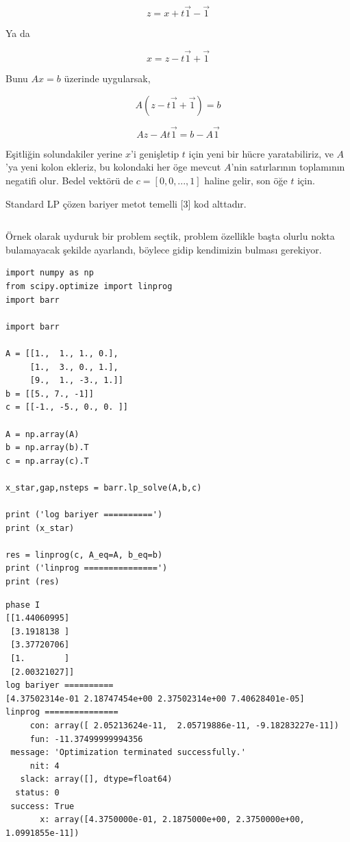 \documentclass[12pt,fleqn]{article}\usepackage{../../common}
\begin{document}
$$
z = x + t \vec{1} - \vec{1}
$$

Ya da

$$
x = z - t\vec{1} + \vec{1}
$$

Bunu $Ax = b$ üzerinde uygularsak, 

$$
A (z - t\vec{1} + \vec{1}) = b
$$

$$
Az - A t\vec{1} = b - A\vec{1}
$$

Eşitliğin solundakiler yerine $x$'i genişletip $t$ için yeni bir hücre
yaratabiliriz, ve $A$'ya yeni kolon ekleriz, bu kolondaki her öge mevcut
$A$'nin satırlarının toplamının negatifi olur. Bedel vektörü de
$c = [0, 0, ..., 1]$ haline gelir, son öğe $t$ için.

Standard LP çözen bariyer metot temelli [3] kod alttadır. 

\inputminted[fontsize=\footnotesize]{python}{barr.py}

Örnek olarak uyduruk bir problem seçtik, problem özellikle başta olurlu
nokta bulamayacak şekilde ayarlandı, böylece gidip kendimizin bulması
gerekiyor.

\begin{verbatim}
import numpy as np
from scipy.optimize import linprog
import barr

import barr

A = [[1.,  1., 1., 0.],
     [1.,  3., 0., 1.],
     [9.,  1., -3., 1.]]
b = [[5., 7., -1]]
c = [[-1., -5., 0., 0. ]]

A = np.array(A)
b = np.array(b).T
c = np.array(c).T

x_star,gap,nsteps = barr.lp_solve(A,b,c)

print ('log bariyer ==========')
print (x_star)

res = linprog(c, A_eq=A, b_eq=b)
print ('linprog ===============')
print (res)
\end{verbatim}

\begin{verbatim}
phase I
[[1.44060995]
 [3.1918138 ]
 [3.37720706]
 [1.        ]
 [2.00321027]]
log bariyer ==========
[4.37502314e-01 2.18747454e+00 2.37502314e+00 7.40628401e-05]
linprog ===============
     con: array([ 2.05213624e-11,  2.05719886e-11, -9.18283227e-11])
     fun: -11.37499999994356
 message: 'Optimization terminated successfully.'
     nit: 4
   slack: array([], dtype=float64)
  status: 0
 success: True
       x: array([4.3750000e-01, 2.1875000e+00, 2.3750000e+00, 1.0991855e-11])
\end{verbatim}
\end{document}
